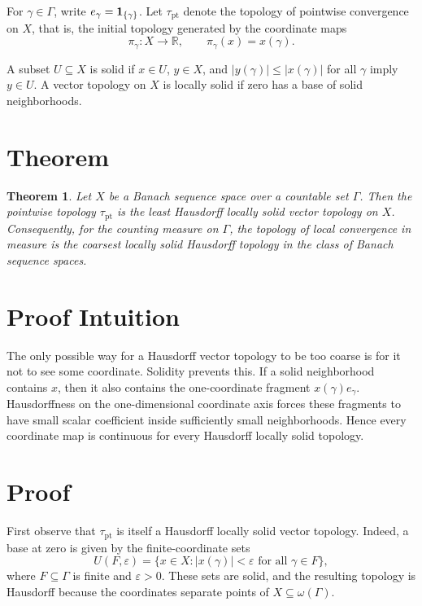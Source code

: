 \documentclass[11pt]{article}
\newtheorem{theorem}{Theorem}
\newcommand{\GammaSet}{\Gamma}
\newcommand{\pt}{\mathrm{pt}}
\newcommand{\abs}[1]{\left\lvert #1 \right\rvert}
\begin{document}
For \(\gamma\in\GammaSet\), write \(e_\gamma={\bf 1}_{\{\gamma\}}\).  Let
\(\tau_{\pt}\) denote the topology of pointwise convergence on \(X\), that is,
the initial topology generated by the coordinate maps
\[
  \pi_\gamma:X\to\mathbb R,\qquad \pi_\gamma(x)=x(\gamma).
\]

A subset \(U\subseteq X\) is solid if \(x\in U\), \(y\in X\), and
\(\abs{y(\gamma)}\le \abs{x(\gamma)}\) for all \(\gamma\) imply \(y\in U\).
A vector topology on \(X\) is locally solid if zero has a base of solid
neighborhoods.

\section*{Theorem}

\begin{theorem}
Let \(X\) be a Banach sequence space over a countable set \(\GammaSet\).  Then
the pointwise topology \(\tau_{\pt}\) is the least Hausdorff locally solid
vector topology on \(X\).  Consequently, for the counting measure on
\(\GammaSet\), the topology of local convergence in measure is the coarsest
locally solid Hausdorff topology in the class of Banach sequence spaces.
\end{theorem}

\section*{Proof Intuition}

The only possible way for a Hausdorff vector topology to be too coarse is for
it not to see some coordinate.  Solidity prevents this.  If a solid
neighborhood contains \(x\), then it also contains the one-coordinate fragment
\(x(\gamma)e_\gamma\).  Hausdorffness on the one-dimensional coordinate axis
forces these fragments to have small scalar coefficient inside sufficiently
small neighborhoods.  Hence every coordinate map is continuous for every
Hausdorff locally solid topology.

\section*{Proof}

First observe that \(\tau_{\pt}\) is itself a Hausdorff locally solid vector
topology.  Indeed, a base at zero is given by the finite-coordinate sets
\[
  U(F,\varepsilon)
  =
  \{x\in X:\abs{x(\gamma)}<\varepsilon
       \text{ for all }\gamma\in F\},
\]
where \(F\subseteq\GammaSet\) is finite and \(\varepsilon>0\).  These sets are
solid, and the resulting topology is Hausdorff because the coordinates
separate points of \(X\subseteq\omega(\GammaSet)\).
\end{document}
